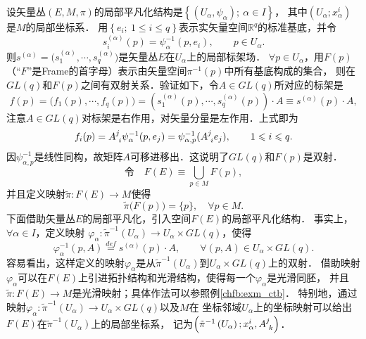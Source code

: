 设矢量丛$(E,M,\pi)$的局部平凡化结构是$\left\{\left(U_{\alpha}, \psi_{\alpha}\right) ;\  \alpha \in I\right\}$，
其中$\left(U_{\alpha} ; x_{\alpha}^{i}\right)$是$M$的局部坐标系．
用$\left\{e_{i} ;\ 1 \leqslant i \leqslant q\right\}$表示实矢量空间$\mathbb{R}^{q}$的标准基底，并令 
\begin{equation}
    s_{i}^{(\alpha)}(p)=\psi_{\alpha}^{-1}\left(p, e_{i}\right), \qquad p \in U_{\alpha} .
\end{equation}
则$s^{(\alpha)}=\bigl(s_{1}^{(\alpha)}, \cdots, s_{q}^{(\alpha)}\bigr)$是矢量丛$E$在$U_{\alpha}$上的局部标架场．
$\forall p \in U_{\alpha}$，用$F(p)$（“$F$”是Frame的首字母）表示由矢量空间$\pi^{-1}(p)$中所有基底构成的集合，
则在$GL(q)$和$F(p)$之间有双射关系．验证如下，令$A \in GL(q)$所对应的标架是 
\begin{equation}\label{chfb:eqn_F-comp}
    f(p)  =\bigl(f_{1}(p), \cdots, f_{q}(p)\bigr) 
    =\left(s_{1}^{(\alpha)}(p), \cdots, s_{q}^{(\alpha)}(p)\right) \cdot A \equiv s^{(\alpha)}(p) \cdot A, 
\end{equation}
注意$A \in GL(q)$对标架是右作用，对矢量分量是左作用．上式即为 
\begin{equation}\label{chfb:eqn_F-comp-expand}
    f_{i}(p)=A_{\hphantom{i}i}^{j} \psi_{\alpha}^{-1}(p, e_{j})
    =\psi_{\alpha, p}^{-1} (A_{\hphantom{i}i}^{j} e_{j}), \qquad 1 \leqslant i \leqslant q .
\end{equation}
因$\psi_{\alpha, p}^{-1}$是线性同构，故矩阵$A$可移进移出．这说明了$GL(q)$和$F(p)$是双射．
\begin{equation}\label{chfb:eqn_FE}
    \text{令}\quad  F(E)\equiv \bigcup_{p \in M} F(p) ,
\end{equation}
并且定义映射$\tilde{\pi}: F(E) \rightarrow M$使得
\begin{equation}\label{chfb:eqn_FE-pi}
    \tilde{\pi}\bigl(F(p)\bigr)=\{p\} , \quad \forall p \in M.
\end{equation}
下面借助矢量丛$E$的局部平凡化，引入空间$F(E)$的局部平凡化结构．
事实上，$\forall \alpha \in I$，定义映射
$\varphi_{\alpha}: \tilde{\pi}^{-1}(U_{\alpha})\to U_{\alpha} \times GL(q) $，使得 
\begin{equation}\label{chfb:eqn_FE-phi}
    \varphi_{\alpha}^{-1}(p, A) \overset{def}{=} s^{(\alpha)}(p)
     \cdot A, \qquad \forall(p, A) \in U_{\alpha} \times GL(q) .
\end{equation}
容易看出，这样定义的映射$\varphi_{\alpha}$是从$\tilde{\pi}^{-1}\left(U_{\alpha}\right)$到$U_{\alpha} \times GL(q)$上的双射．
借助映射$\varphi_{\alpha}$可以在$F(E)$上引进拓扑结构和光滑结构，使得每一个$\varphi_{\alpha}$是光滑同胚，
并且$\tilde{\pi}: F(E) \rightarrow M$是光滑映射；具体作法可以参照例\ref{chfb:exm_ctb}．  
特别地，通过映射$\varphi_{\alpha}: \tilde{\pi}^{-1}(U_{\alpha}) \rightarrow U_{\alpha} \times GL(q)$以及$M$在
坐标邻域$U_{\alpha}$上的坐标映射可以给出$F(E)$在$\tilde{\pi}^{-1}(U_{\alpha})$上的局部坐标系，
记为$\left(\tilde{\pi}^{-1}\left(U_{\alpha}\right) ; x_{\alpha}^{i}, A_{\hphantom{i}k}^{j} \right)$．

